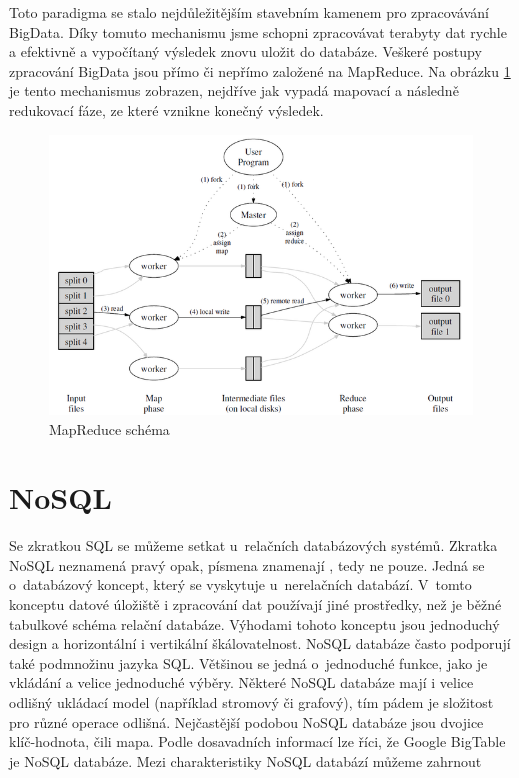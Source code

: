 Toto paradigma se stalo nejdůležitějším stavebním kamenem pro zpracovávání BigData. Díky tomuto mechanismu jsme schopni zpracovávat terabyty dat rychle a efektivně a vypočítaný výsledek znovu uložit do databáze. Veškeré postupy zpracování BigData jsou přímo či nepřímo založené na MapReduce. Na obrázku \ref{fig:mapreduce} je tento mechanismus zobrazen, nejdříve jak vypadá mapovací a následně redukovací fáze, ze které vznikne konečný výsledek.

\begin{figure}[!h]
\includegraphics[scale=0.6]{images/mapreduce}
\caption{MapReduce schéma \cite{dean2008mapreduce}}
\label{fig:mapreduce}
\end{figure}

\newpage

\section{NoSQL}
Se zkratkou SQL se můžeme setkat u~relačních databázových systémů. Zkratka NoSQL neznamená pravý opak, písmena  znamenají , tedy ne pouze. Jedná se o~databázový koncept, který se vyskytuje u~nerelačních databází. V~tomto konceptu datové úložiště i zpracování dat používají jiné prostředky, než je běžné tabulkové schéma relační databáze. Výhodami tohoto konceptu jsou jednoduchý design a horizontální i vertikální škálovatelnost. NoSQL databáze často podporují také podmnožinu jazyka SQL. Většinou se jedná o~jednoduché funkce, jako je vkládání a velice jednoduché výběry. Některé NoSQL databáze mají i velice odlišný ukládací model (například stromový či grafový), tím pádem je složitost pro různé operace odlišná. Nejčastější podobou NoSQL databáze jsou dvojice klíč-hodnota, čili mapa. Podle dosavadních informací lze říci, že Google BigTable je NoSQL databáze. Mezi charakteristiky NoSQL databází můžeme zahrnout

